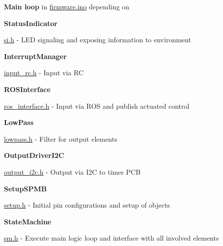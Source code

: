 \begin{DoxyItemize}
\item {\bfseries Main loop} in \hyperlink{firmware_8ino_source}{firmware.\+ino} depending on
\begin{DoxyItemize}
\item {\bfseries Status\+Indicator}
\begin{DoxyItemize}
\item \hyperlink{si_8h_source}{si.\+h} -\/ L\+ED signaling and exposing information to environment
\end{DoxyItemize}
\item {\bfseries Interrupt\+Manager}
\begin{DoxyItemize}
\item \hyperlink{input__rc_8h_source}{input\+\_\+rc.\+h} -\/ Input via RC
\end{DoxyItemize}
\item {\bfseries R\+O\+S\+Interface}
\begin{DoxyItemize}
\item \hyperlink{ros__interface_8h_source}{ros\+\_\+interface.\+h} -\/ Input via R\+OS and publish actuated control
\end{DoxyItemize}
\item {\bfseries Low\+Pass}
\begin{DoxyItemize}
\item \hyperlink{lowpass_8h_source}{lowpass.\+h} -\/ Filter for output elements
\end{DoxyItemize}
\item {\bfseries Output\+Driver\+I2C}
\begin{DoxyItemize}
\item \hyperlink{output__i2c_8h_source}{output\+\_\+i2c.\+h} -\/ Output via I2C to timer P\+CB
\end{DoxyItemize}
\item {\bfseries Setup\+S\+P\+MB}
\begin{DoxyItemize}
\item \hyperlink{setup_8h_source}{setup.\+h} -\/ Initial pin configurations and setup of objects
\end{DoxyItemize}
\item {\bfseries State\+Machine}
\begin{DoxyItemize}
\item \hyperlink{sm_8h_source}{sm.\+h} -\/ Execute main logic loop and interface with all involved elements
\end{DoxyItemize}
\end{DoxyItemize}
\end{DoxyItemize}





